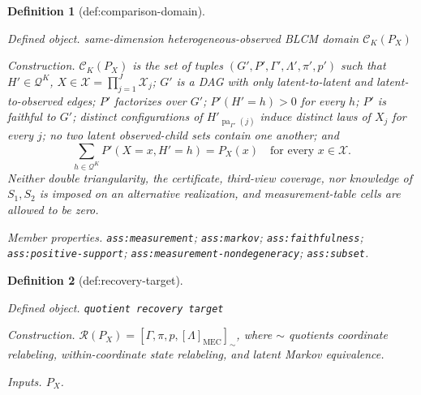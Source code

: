 \documentclass{article}
\newtheorem{definition}{Definition}
\begin{document}
\begin{definition}[def:comparison-domain]\label{def:comparison-domain}
\par\smallskip\noindent\emph{Defined object.} same-dimension heterogeneous-observed BLCM domain \(\mathcal C_K(P_X)\)
\par\smallskip\noindent\emph{Construction.} \(\mathcal C_K(P_X)\) is the set of tuples \((G',P',\Gamma',\Lambda',\pi',p')\) such that \(H'\in\mathcal Q^K\), \(X\in\mathcal X=\prod_{j=1}^J\mathcal X_j\); \(G'\) is a DAG with only latent-to-latent and latent-to-observed edges; \(P'\) factorizes over \(G'\); \(P'(H'=h)>0\) for every \(h\); \(P'\) is faithful to \(G'\); distinct configurations of \(H'_{\operatorname{pa}_{\Gamma'}(j)}\) induce distinct laws of \(X_j\) for every \(j\); no two latent observed-child sets contain one another; and
\[
 \sum_{h\in\mathcal Q^K}P'(X=x,H'=h)=P_X(x)
 \quad\text{for every }x\in\mathcal X.
\]
Neither double triangularity, the certificate, third-view coverage, nor knowledge of \(S_1,S_2\) is imposed on an alternative realization, and measurement-table cells are allowed to be zero.
\par\smallskip\noindent\emph{Member properties.} \texttt{ass:\allowbreak{}measurement}; \texttt{ass:\allowbreak{}markov}; \texttt{ass:\allowbreak{}faithfulness}; \texttt{ass:\allowbreak{}positive-\allowbreak{}support}; \texttt{ass:\allowbreak{}measurement-\allowbreak{}nondegeneracy}; \texttt{ass:\allowbreak{}subset}.
\end{definition}

\begin{definition}[def:recovery-target]\label{def:recovery-target}
\par\smallskip\noindent\emph{Defined object.} \texttt{quotient recovery target}
\par\smallskip\noindent\emph{Construction.} \(\mathcal R(P_X)=[\Gamma,\pi,p,[\Lambda]_{\mathrm{MEC}}]_{\sim}\), where \(\sim\) quotients coordinate relabeling, within-coordinate state relabeling, and latent Markov equivalence.
\par\smallskip\noindent\emph{Inputs.} \(P_X\).
\end{definition}
\end{document}
